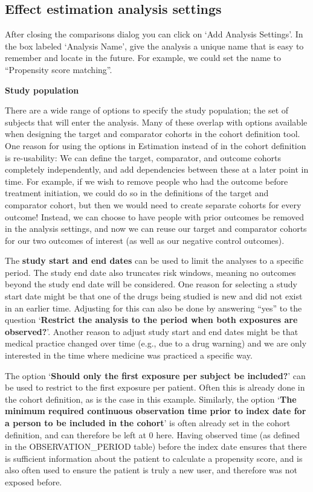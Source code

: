 \documentclass[11pt]{book}
\begin{document}
\subsection{Effect estimation analysis
settings}\label{effect-estimation-analysis-settings}

After closing the comparisons dialog you can click on `Add Analysis
Settings'. In the box labeled `Analysis Name', give the analysis a
unique name that is easy to remember and locate in the future. For
example, we could set the name to ``Propensity score matching''.

\textbf{Study population}

There are a wide range of options to specify the study population; the
set of subjects that will enter the analysis. Many of these overlap with
options available when designing the target and comparator cohorts in
the cohort definition tool. One reason for using the options in
Estimation instead of in the cohort definition is re-usability: We can
define the target, comparator, and outcome cohorts completely
independently, and add dependencies between these at a later point in
time. For example, if we wish to remove people who had the outcome
before treatment initiation, we could do so in the definitions of the
target and comparator cohort, but then we would need to create separate
cohorts for every outcome! Instead, we can choose to have people with
prior outcomes be removed in the analysis settings, and now we can reuse
our target and comparator cohorts for our two outcomes of interest (as
well as our negative control outcomes).

The \textbf{study start and end dates} can be used to limit the analyses
to a specific period. The study end date also truncates risk windows,
meaning no outcomes beyond the study end date will be considered. One
reason for selecting a study start date might be that one of the drugs
being studied is new and did not exist in an earlier time. Adjusting for
this can also be done by answering ``yes'' to the question
`\textbf{Restrict the analysis to the period when both exposures are
observed?}'. Another reason to adjust study start and end dates might be
that medical practice changed over time (e.g., due to a drug warning)
and we are only interested in the time where medicine was practiced a
specific way.

The option `\textbf{Should only the first exposure per subject be
included?}' can be used to restrict to the first exposure per patient.
Often this is already done in the cohort definition, as is the case in
this example. Similarly, the option `\textbf{The minimum required
continuous observation time prior to index date for a person to be
included in the cohort}' is often already set in the cohort definition,
and can therefore be left at 0 here. Having observed time (as defined in
the OBSERVATION\_PERIOD table) before the index date ensures that there
is sufficient information about the patient to calculate a propensity
score, and is also often used to ensure the patient is truly a new user,
and therefore was not exposed before.
\end{document}

